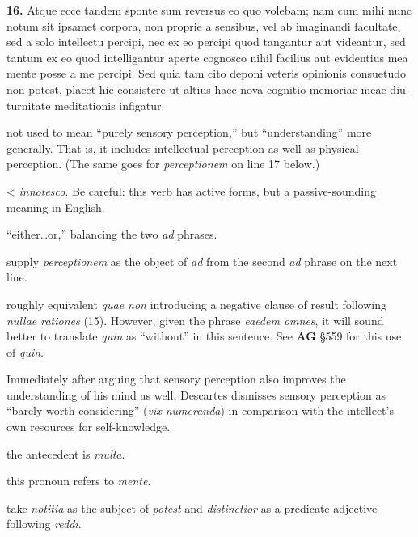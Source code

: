\beginnumbering
\pstart
\begin{latin}
    \textenglish{\textbf{16.}} Atque ecce tandem sponte sum reversus eo quo volebam; nam cum mihi nunc notum sit ipsamet corpora, non proprie a sensibus, vel ab imaginandi facultate, sed a solo intellectu percipi, nec ex eo percipi quod tangantur aut videantur, sed tantum ex eo quod intelligantur aperte cognosco nihil facilius aut evidentius mea mente posse a me percipi. Sed quia tam cito deponi veteris opinionis consuetudo non potest, placet hic consistere ut altius haec nova cognitio memoriae meae diuturnitate meditationis infigatur.
\end{latin}
\pend
\endnumbering

\prenotes

 not used to mean ``purely sensory perception,'' but ``understanding'' more generally. That is, it includes intellectual perception as well as physical perception. (The same goes for \textit{perceptionem} on line 17 below.)

 < \textit{innotesco}. Be careful: this verb has active forms, but a passive-sounding meaning in English.

 ``either\dots or,'' balancing the two \textit{ad} phrases.

 supply \textit{perceptionem} as the object of \textit{ad} from the second \textit{ad} phrase on the next line.

 roughly equivalent \textit{quae non} introducing a negative clause of result following \textit{nullae rationes} (15). However, given the phrase \textit{eaedem omnes}, it will sound better to translate \textit{quin} as ``without'' in this sentence. See \textbf{AG} §559 for this use of \textit{quin}.

 Immediately after arguing that sensory perception also improves the understanding of his mind as well, Descartes dismisses sensory perception as ``barely worth considering'' (\textit{vix numeranda}) in comparison with the intellect's own resources for self-knowledge.

 the antecedent is \textit{multa}.

 this pronoun refers to \textit{mente}.

 take \textit{notitia} as the subject of \textit{potest} and \textit{distinctior} as a predicate adjective following \textit{reddi}.

